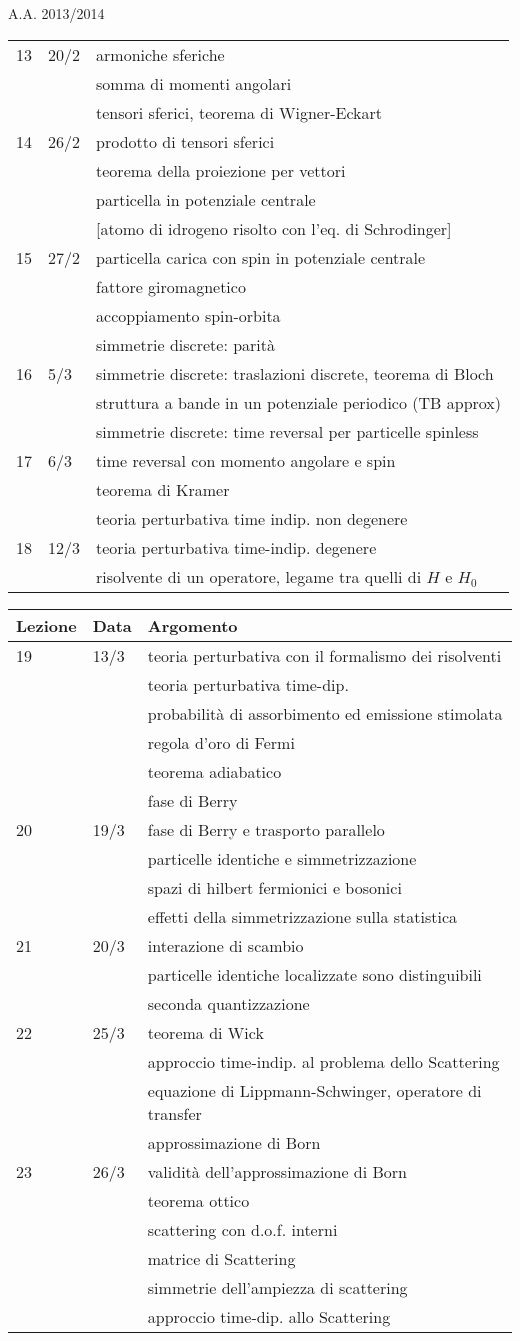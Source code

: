 \documentclass[a4paper, 12pt]{article}
\newcommand{\nl}{\\ & & }
\newcommand{\nr}{\\ \midrule}
\begin{document}
\begin{section}{A.A. 2013/2014}
\begin{tabular}{lll}
13 & 20/2 & armoniche sferiche \nl somma di momenti angolari \nl tensori sferici, teorema di Wigner-Eckart \nr

14 & 26/2 & prodotto di tensori sferici \nl teorema della proiezione per vettori \nl particella in  potenziale centrale \nl [atomo di idrogeno risolto con l'eq. di Schrodinger]\nr

15 & 27/2 & particella carica con spin in potenziale centrale \nl fattore giromagnetico \nl accoppiamento spin-orbita \nl simmetrie discrete: parità \nr 

16 & 5/3 & simmetrie discrete: traslazioni discrete, teorema di Bloch \nl struttura a bande in un potenziale periodico (TB approx) \nl simmetrie discrete: time reversal per particelle spinless  \nr 

17 & 6/3 & time reversal con momento angolare e spin \nl teorema di Kramer \nl teoria perturbativa time indip. non degenere\nr 

18 & 12/3 & teoria perturbativa time-indip. degenere \nl risolvente di un operatore, legame tra quelli di $H$ e $H_0$\nr

\end{tabular}

\begin{tabular}{lll}
Lezione & Data & Argomento\nr

19 & 13/3 & teoria perturbativa con il formalismo dei risolventi \nl teoria perturbativa time-dip. \nl probabilità di assorbimento ed emissione stimolata \nl regola d'oro di Fermi \nl teorema adiabatico \nl fase di Berry \nr 

20 & 19/3 & fase di Berry e trasporto parallelo \nl particelle identiche e simmetrizzazione \nl spazi di hilbert fermionici e bosonici \nl effetti della simmetrizzazione sulla statistica \nr 

21 & 20/3 & interazione di scambio \nl particelle identiche localizzate sono distinguibili \nl seconda quantizzazione \nr 

22 & 25/3 & teorema di Wick \nl approccio time-indip. al problema dello Scattering \nl equazione di Lippmann-Schwinger, operatore di transfer \nl approssimazione di Born \nr

23 & 26/3 & validità dell'approssimazione di Born \nl teorema ottico \nl scattering con d.o.f. interni \nl matrice di Scattering \nl simmetrie dell'ampiezza di scattering \nl approccio time-dip. allo Scattering  \nr
\bottomrule
\end{tabular}

\end{section}
\end{document}
